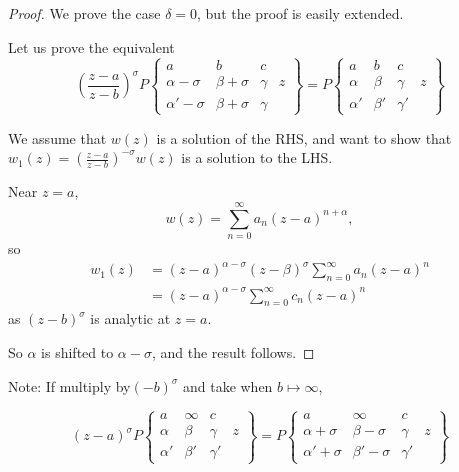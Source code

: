 \documentclass[a4paper]{article}
\begin{document}
\begin{proof} 
	We prove the case $\delta = 0$, but the proof is easily extended.

	Let us prove the equivalent 
	\[
		\left( \frac{z-a}{z-b} \right)^{\sigma} P \begin{Bmatrix} a & b & c & \\
                                \alpha - \sigma & \beta+\sigma & \gamma & z \\
				\alpha' -\sigma & \beta + \sigma & \gamma&
			\end{Bmatrix}
			= P \begin{Bmatrix} a & b & c & \\
                                \alpha & \beta & \gamma & z \\
				\alpha' & \beta' & \gamma' &
			\end{Bmatrix}
	\] 

	We assume that $w(z)$ is a solution of the RHS, and want to show that $w_1(z) = \left( \frac{z-a}{z-b} \right)^{-\sigma} w(z) $ is a solution to the LHS.

Near $z=a$, 
 \[
	 w(z) = \sum_{n=0}^{\infty} a_n \left( z-a \right)^{n+\alpha}
,\]
so
\begin{align*}
	w_1(z) &= \left( z -a \right)^{\alpha - \sigma} \left( z-\beta \right)^{\sigma} \sum_{n=0}^{\infty} a_n (z-a)^{n} \\
	&= (z-a)^{\alpha - \sigma} \sum_{n=0}^{\infty} c_n (z-a)^{n}
\end{align*} as $(z-b)^{\sigma}$ is analytic at $z=a$.

So  $\alpha$ is shifted to $\alpha - \sigma$, and the result follows.
\end{proof}

Note: If multiply  by$(-b)^{\sigma}$ and take when $b \mapsto \infty$, 

\[
	(z-a)^{\sigma} P \begin{Bmatrix} a & \infty & c & \\
                                \alpha & \beta & \gamma & z \\
				\alpha' & \beta' & \gamma' &
			\end{Bmatrix} = P \begin{Bmatrix} a & \infty & c & \\
                                \alpha + \sigma  & \beta - \sigma & \gamma & z \\
				\alpha' + \sigma & \beta' - \sigma & \gamma' &
			\end{Bmatrix}
\] 
\end{document}
